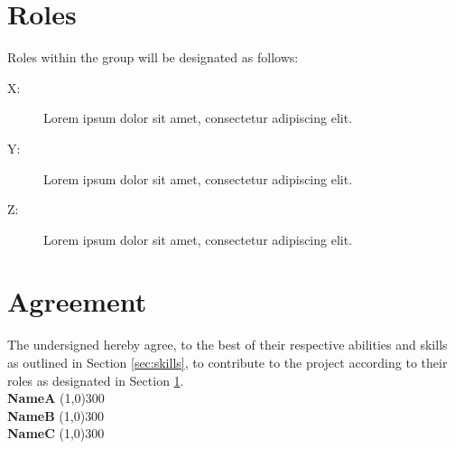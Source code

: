 \documentclass{article}
\newcommand{\groupmember}[1]{#1}
\newcommand{\role}[1]{#1}
\newcommand{\sigline}[2]{\vspace{2em} #1 \hfill \line(1,0){#2}}
\begin{document}
\section{Roles} %
\label{sec:roles}

Roles within the group will be designated as follows:

\begin{description}
    \item[\role{X}:] Lorem ipsum dolor sit amet, consectetur adipiscing elit.
    \item[\role{Y}:] Lorem ipsum dolor sit amet, consectetur adipiscing elit.
    \item[\role{Z}:] Lorem ipsum dolor sit amet, consectetur adipiscing elit.
\end{description}

\section{Agreement} %
\label{par:agreement}
The undersigned hereby agree, to the best of their respective abilities and skills as outlined in Section \ref{sec:skills}, to contribute to the project according to their roles as designated in Section \ref{sec:roles}.%
\vspace{2em}\\
\sigline{\textbf{\groupmember{NameA}}}{300}\\
\sigline{\textbf{\groupmember{NameB}}}{300}\\
\sigline{\textbf{\groupmember{NameC}}}{300}\\
\end{document}
